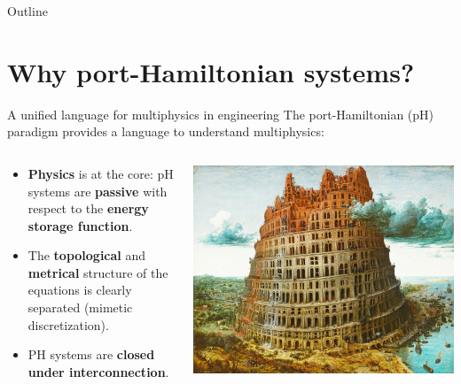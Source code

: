 \documentclass[aspectratio=169]{beamer}
\begin{document}
	
	
	\begin{frame}[plain]
		
		
		
	\end{frame}

	
	\begin{frame}{Outline}
		
		\tableofcontents
		
	\end{frame}

\section{Why port-Hamiltonian systems?}


\begin{frame}{A unified language for multiphysics in engineering}
	The port-Hamiltonian (pH) paradigm provides a language to understand multiphysics:

	\vspace{.3cm}
	
	\begin{columns}
		\begin{column}{.68\textwidth}
			\begin{itemize}
				\item \textbf{Physics} is at the core: pH systems are \textbf{passive} with respect to the \textbf{energy storage function}.
				\item The \textbf{topological} and \textbf{metrical} structure of the equations is clearly separated (mimetic discretization).
				\item PH systems are \textbf{closed under interconnection}. 
			\end{itemize}
		\end{column}
		\begin{column}{.32\textwidth}
			\centering
			\includegraphics[width=.9\columnwidth]{babel_tower.jpeg}
		\end{column}
	\end{columns}

	
\end{frame}
\end{document}
